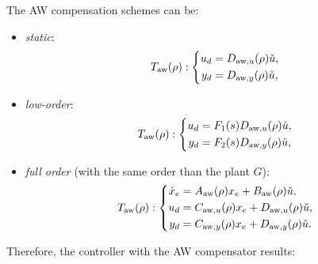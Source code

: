 \documentclass[fleqn,11pt]{article}
\begin{document}
The AW compensation schemes can be:
\begin{itemize}
    \item \emph{static}:
        \begin{equation*}
            T_{\mathrm{aw}}(\rho):\left\{
                \begin{aligned}
                    u_d &= D_{\mathrm{aw},u}(\rho)\check{u},\\
                    y_d &= D_{\mathrm{aw},y}(\rho)\check{u},
                \end{aligned}
                \right.
        \end{equation*}
    \item \emph{low-order}:
        \begin{equation*}
            T_{\mathrm{aw}}(\rho):\left\{
                \begin{aligned}
                    u_d &= F_1(s)D_{\mathrm{aw},u}(\rho)\check{u},\\
                    y_d &= F_2(s)D_{\mathrm{aw},y}(\rho)\check{u},
                \end{aligned}
                \right.
        \end{equation*}
    \item \emph{full order} (\ie with the same order than the plant $G$):
        \begin{equation*}
            T_{\mathrm{aw}}(\rho):\left\{
                \begin{aligned}
                    \dot x_e &= A_{\mathrm{aw}}(\rho) x_e  + B_{\mathrm{aw}}(\rho)\check{u},\\
                         u_d &= C_{\mathrm{aw},u}(\rho) x_e + D_{\mathrm{aw},u}(\rho)\check{u},\\
                         y_d &= C_{\mathrm{aw},y}(\rho) x_e + D_{\mathrm{aw},y}(\rho)\check{u}.
                \end{aligned}
                \right.
        \end{equation*}
\end{itemize}
Therefore, the controller with the AW compensator results:
\end{document}
